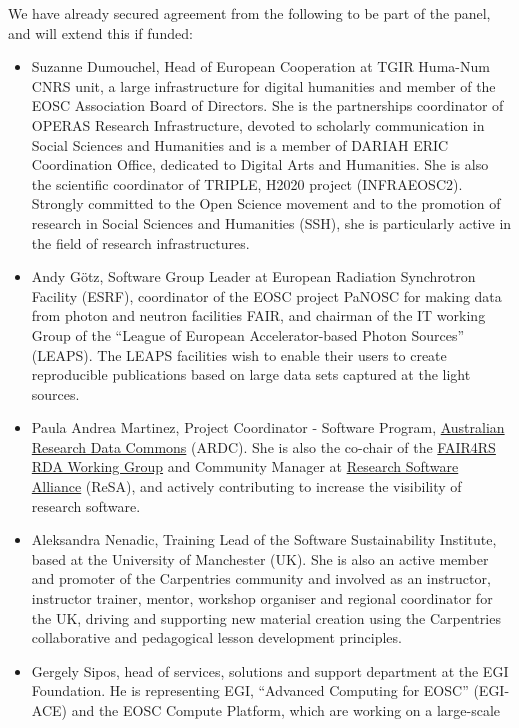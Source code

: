 We have already secured agreement from the following to be part of the panel,
and will extend this if funded:
\begin{itemize}
\item Suzanne Dumouchel, Head of European Cooperation at TGIR Huma-Num CNRS unit, a large infrastructure for 
digital humanities and member of the EOSC Association Board of Directors. She is the partnerships coordinator 
of OPERAS Research Infrastructure, devoted to scholarly communication in Social Sciences and Humanities and is a member of DARIAH ERIC Coordination Office, 
dedicated to Digital Arts and Humanities. She is also the scientific coordinator of TRIPLE, H2020 project 
(INFRAEOSC2). Strongly committed to the Open Science movement and to the promotion of research in Social Sciences 
and Humanities (SSH), she is particularly active in the field of research infrastructures.
\item Andy Götz, Software Group Leader at European Radiation Synchrotron
  Facility (ESRF), coordinator of the EOSC project PaNOSC for making data from
  photon and neutron facilities FAIR, and chairman of the IT working Group of
  the ``League of European Accelerator-based Photon Sources'' (LEAPS). The LEAPS
  facilities wish to enable their users to create reproducible publications
  based on large data sets captured at the light sources.
\item Paula Andrea Martinez, Project Coordinator - Software Program, \href{https://ardc.edu.au/}{Australian Research Data Commons} (ARDC).
She is also the co-chair of the \href{https://www.rd-alliance.org/groups/fair-research-software-fair4rs-wg}{FAIR4RS RDA Working Group} and
Community Manager at \href{https://www.researchsoft.org/}{Research Software Alliance} (ReSA), and actively contributing
to increase the visibility of research software.
\item Aleksandra Nenadic, Training Lead of the Software Sustainability Institute, 
based at the University of Manchester (UK). She is also an active member and 
promoter of the Carpentries community and involved as an instructor, 
instructor trainer, mentor, workshop organiser and regional coordinator 
for the UK, driving and supporting new material creation using the 
Carpentries collaborative and pedagogical lesson development principles.
\item Gergely Sipos, head of services, solutions and support department at the
  EGI Foundation. He is representing EGI, ``Advanced Computing for EOSC''
  (EGI-ACE) and the EOSC Compute Platform, which are working on a large-scale

\end{itemize}
